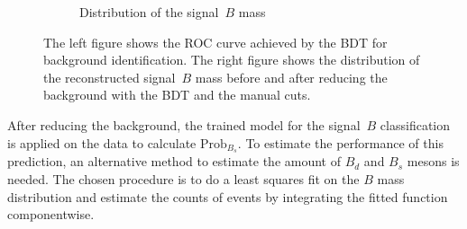 \begin{figure}
\begin{subfigure}{0.5\textwidth}
        \caption{Distribution of the signal~$B$ mass}
        \label{fig:BKG_reduced}
    \end{subfigure}%
    \caption{The left figure shows the ROC curve achieved by the BDT for background identification. The right figure shows the distribution of the reconstructed signal~$B$ mass before and after reducing the background with the BDT and the manual cuts.}
\end{figure}

After reducing the background, the trained model for the signal~$B$ classification is applied on the data to calculate $\text{Prob}_{B_s}$.
To estimate the performance of this prediction, an alternative method to estimate the amount of $B_d$ and $B_s$ mesons is needed.
The chosen procedure is to do a least squares fit on the $B$ mass distribution and estimate the counts of events by integrating the fitted function componentwise.

